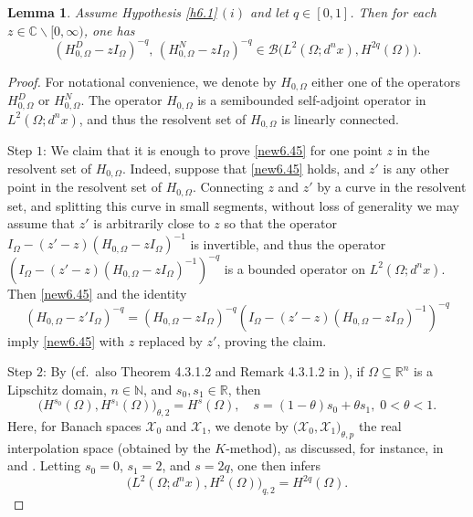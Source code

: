 \documentclass[reqno,10pt, centertags]{amsart}
\newcommand{\bbN}{{\mathbb{N}}}
\newcommand{\bbR}{{\mathbb{R}}}
\newcommand{\bbC}{{\mathbb{C}}}
\newcommand{\cB}{{\mathcal B}}
\newcommand{\Om}{\Omega}
\numberwithin{equation}{section}
\newtheorem{lemma}[theorem]{Lemma}
\theoremstyle{definition}
\begin{document}
\begin{lemma}\label{lA.2}
Assume Hypothesis \ref{h6.1}\,$(i)$ and let %
$q\in [0,1]$. Then for each
$z\in\bbC\backslash[0,\infty)$, one has
\begin{equation}\label{new6.45}
(H_{0,\Om}^D-zI_{\Om})^{-q},\,
(H_{0,\Om}^N-zI_{\Om})^{-q}\in\cB\big(L^2(\Om;d^nx),H^{2q}(\Om)\big).
\end{equation}
\end{lemma}
\begin{proof}
For notational convenience, we denote by $H_{0,\Om}$ either one of the
operators $H_{0,\Om}^D$ or $H_{0,\Om}^N$. The operator $H_{0,\Om}$ is a
semibounded self-adjoint operator in $L^{2}(\Omega;d^nx)$, and thus the
resolvent set of $H_{0,\Om}$ is linearly connected.

Step $1$: We claim that it is enough to prove \eqref{new6.45} for one
point $z$ in the resolvent set of $H_{0,\Om}$. Indeed, suppose that
\eqref{new6.45} holds, and $z'$ is any other point in the resolvent
set of $H_{0,\Om}$. Connecting $z$ and $z'$ by a curve in the resolvent
set, and splitting this curve in small segments, without loss of
generality we may assume that $z'$ is arbitrarily close to $z$ so that
the operator $I_{\Omega}-(z'-z)(H_{0,\Om}-zI_{\Omega})^{-1}$ is invertible, and
thus the operator $(I_{\Omega}-(z'-z)(H_{0,\Om}-zI_{\Omega})^{-1})^{-q}$ is a
bounded operator on $L^2(\Om;d^nx)$. Then \eqref{new6.45} and the identity
\begin{equation}
(H_{0,\Om}-z'I_{\Omega})^{-q}=(H_{0,\Om}-zI_{\Omega})^{-q}
(I_{\Omega}-(z'-z)(H_{0,\Om}-zI_{\Omega})^{-1})^{-q}
\end{equation}
imply \eqref{new6.45} with $z$ replaced by $z'$, proving the claim.

Step $2$: By \cite[Theorem B.8]{Mc00} (cf.\ also Theorem
4.3.1.2 and Remark 4.3.1.2 in \cite{Tr78}), if
$\Omega\subseteq\bbR^n$ is a Lipschitz domain, $n\in\bbN$,
and $s_0,s_1\in\bbR$, then
\begin{equation}
\Big(H^{s_0}(\Omega),H^{s_1}(\Omega)\Big)_{\theta,2} =
H^{s}(\Omega), \quad  s=(1-\theta)s_0+\theta s_1,\;
0<\theta<1.
\end{equation}
Here, for Banach spaces $\mathcal{X}_0$ and $\mathcal{X}_1$, we denote by
$\big(\mathcal{X}_0,\mathcal{X}_1\big)_{\theta,p}$ the real
interpolation space (obtained by the $K$-method), as discussed, for
instance, in  \cite[Appendix B]{Mc00} and \cite[Sect.\ 1.3]{Tr78}. Letting
$s_0=0$, $s_1=2$, and $s=2q$, one then infers
\begin{equation}\label{INTERPOLATION}
\Big(L^{2}(\Omega;d^nx),H^{2}(\Omega)\Big)_{q,2}=H^{2q}(\Omega).
\end{equation}


\end{proof}
\end{document}
